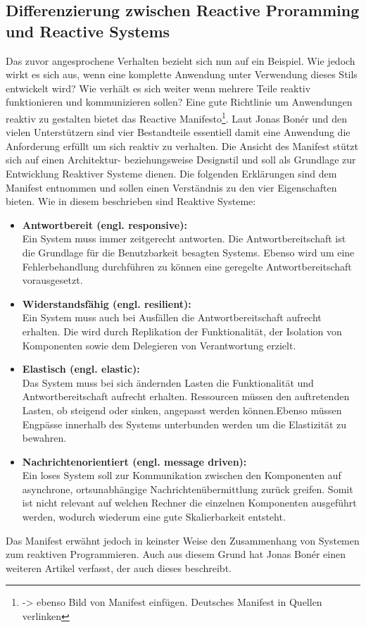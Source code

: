\subsection{Differenzierung zwischen Reactive Proramming und Reactive Systems}
Das zuvor angesprochene Verhalten bezieht sich nun auf ein Beispiel. Wie jedoch wirkt es sich aus, wenn eine komplette Anwendung unter Verwendung dieses Stils entwickelt wird? Wie verhält es sich weiter wenn mehrere Teile reaktiv funktionieren und kommunizieren sollen? Eine gute Richtlinie um Anwendungen reaktiv zu gestalten bietet das Reactive Manifesto\footnote{\cite{Boner.} -> ebenso Bild von Manifest einfügen. Deutsches Manifest in Quellen verlinken}. Laut Jonas Bonér und den vielen Unterstützern sind vier Bestandteile essentiell damit eine Anwendung die Anforderung erfüllt um sich reaktiv zu verhalten. Die Ansicht des Manifest stützt sich auf einen Architektur- beziehungsweise Designstil und soll als Grundlage zur Entwicklung Reaktiver Systeme dienen. Die folgenden Erklärungen sind dem Manifest entnommen und sollen einen Verständnis zu den vier Eigenschaften bieten. Wie in diesem beschrieben sind Reaktive Systeme:
\begin{itemize}
	\item \textbf{Antwortbereit (engl. responsive):}\\ Ein System muss immer zeitgerecht antworten. Die Antwortbereitschaft ist die Grundlage für die Benutzbarkeit besagten Systems. Ebenso wird um eine Fehlerbehandlung durchführen zu können eine geregelte Antwortbereitschaft vorausgesetzt.
	\item \textbf{Widerstandsfähig (engl. resilient):}\\ Ein System muss auch bei Ausfällen die Antwortbereitschaft aufrecht erhalten. Die wird durch Replikation der Funktionalität, der Isolation von Komponenten sowie dem Delegieren von Verantwortung erzielt. 
	\item \textbf{Elastisch (engl. elastic):}\\ Das System muss bei sich ändernden Lasten die Funktionalität und Antwortbereitschaft aufrecht erhalten. Ressourcen müssen den auftretenden Lasten, ob steigend oder sinken, angepasst werden können.Ebenso müssen Engpässe innerhalb des Systems unterbunden werden um die Elastizität zu bewahren.
	\item \textbf{Nachrichtenorientiert (engl. message driven):}\\ Ein loses System soll zur Kommunikation zwischen den Komponenten auf asynchrone, ortsunabhängige Nachrichtenübermittlung zurück greifen. Somit ist nicht relevant auf welchen Rechner die einzelnen Komponenten ausgeführt werden, wodurch wiederum eine gute Skalierbarkeit entsteht.
\end{itemize}
Das Manifest erwähnt jedoch in keinster Weise den Zusammenhang von Systemen zum reaktiven Programmieren. Auch aus diesem Grund hat Jonas Bonér einen weiteren Artikel verfasst, der auch dieses beschreibt. 
